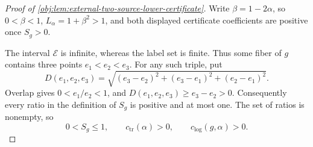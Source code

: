\documentclass[11pt]{article}
\begin{document}
\begin{proof}[Proof of \cref{obj:lem:external-two-source-lower-certificate}]
Write \(\beta=1-2\alpha\), so \(0<\beta<1\), \(L_\alpha=1+\beta^2>1\), and both displayed certificate coefficients are positive once \(S_g>0\).

The interval \(\mathcal E\) is infinite, whereas the label set is finite. Thus some fiber of \(g\) contains three points \(e_1<e_2<e_3\). For any such triple, put
\[
D(e_1,e_2,e_3)
=\sqrt{(e_3-e_2)^2+(e_3-e_1)^2+(e_2-e_1)^2}.
\]
Overlap gives \(0<e_1/e_2<1\), and \(D(e_1,e_2,e_3)\ge e_3-e_2>0\). Consequently every ratio in the definition of \(S_g\) is positive and at most one. The set of ratios is nonempty, so
\[
0<S_g\le1,\qquad c_{\mathrm{tr}}(\alpha)>0,\qquad
c_{\mathrm{log}}(g,\alpha)>0.
\]


\end{proof}
\end{document}
